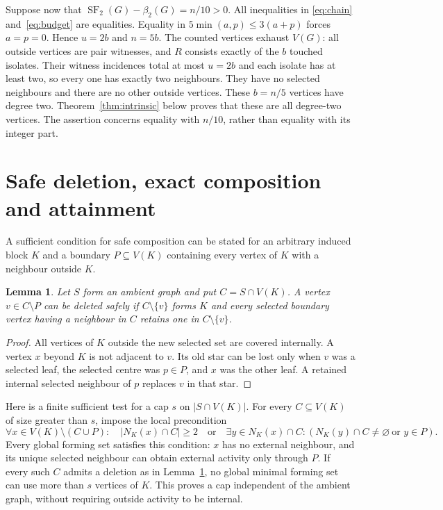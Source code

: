 \documentclass[11pt]{article}
\newtheorem{lemma}[theorem]{Lemma}
\newcommand{\SF}{\operatorname{SF}_2}
\newcommand{\diss}{\beta_2}
\begin{document}
Suppose now that $\SF(G)-\diss(G)=n/10>0$. All inequalities in
\eqref{eq:chain} and~\eqref{eq:budget} are equalities. Equality in
$5\min(a,p)\le3(a+p)$ forces $a=p=0$. Hence $u=2b$ and $n=5b$.
The counted vertices exhaust $V(G)$: all outside vertices are pair
witnesses, and $R$ consists exactly of the $b$ touched isolates.
Their witness incidences total at most $u=2b$ and each isolate has at
least two, so every one has exactly two neighbours. They have no selected
neighbours and there are no other outside vertices. These $b=n/5$
vertices have degree two. Theorem~\ref{thm:intrinsic} below proves
that these are all degree-two vertices. The assertion concerns equality with $n/10$,
rather than equality with its integer part.

\section{Safe deletion, exact composition and attainment}\label{sec:attainment}

A sufficient condition for safe composition can be stated for an arbitrary
induced block $K$ and a boundary $P\subseteq V(K)$ containing every vertex
of $K$ with a neighbour outside $K$.

\begin{lemma}\label{lem:boundary}
Let $S$ form an ambient graph and put $C=S\cap V(K)$. A vertex
$v\in C\setminus P$ can be deleted safely if $C\setminus\{v\}$ forms
$K$ and every selected boundary vertex having a neighbour in $C$ retains
one in $C\setminus\{v\}$.
\end{lemma}
\begin{proof}
All vertices of $K$ outside the new selected set are covered
internally. A vertex $x$ beyond $K$ is not adjacent to $v$. Its old star
can be lost only when $v$ was a selected leaf, the selected centre was
$p\in P$, and $x$ was the other leaf. A retained internal selected
neighbour of $p$ replaces $v$ in that star.
\end{proof}

Here is a finite sufficient test for a cap $s$ on $|S\cap V(K)|$.
For every $C\subseteq V(K)$ of size greater than $s$, impose the local
precondition
\begin{equation}\label{eq:boundarypre}
 \forall x\in V(K)\setminus(C\cup P):\quad
 |N_K(x)\cap C|\ge2\quad\text{or}\quad
 \exists y\in N_K(x)\cap C:
       (N_K(y)\cap C\ne\varnothing\ \text{or }y\in P).
\end{equation}
Every global forming set satisfies this condition: $x$ has no external
neighbour, and its unique selected neighbour can obtain external activity
only through $P$. If every such $C$ admits a deletion as in
Lemma~\ref{lem:boundary}, no global minimal forming set can use more
than $s$ vertices of $K$. This proves a cap independent of the ambient
graph, without requiring outside activity to be internal.
\end{document}
